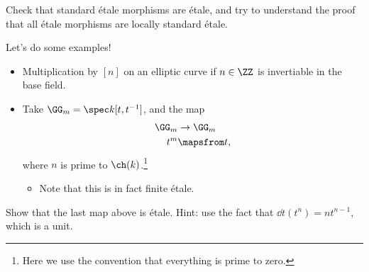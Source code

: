 \begin{exercise}[?]

Check that standard étale morphisms are étale, and try to understand the
proof that all étale morphisms are locally standard étale.

\end{exercise}

Let's do some examples!

\begin{example}

\envlist

\begin{itemize}
\item
  Multiplication by \([n]\) on an elliptic curve if \(n \in \ZZ\) is
  invertiable in the base field.
\item
  Take \(\GG_m = \spec k[t, t^{-1}]\), and the map
  \begin{align*}  
  \GG_m &\to \GG_m \\
   t^m &\mapsfrom t
  ,\end{align*} where \(n\) is prime to \(\ch(k)\).\footnote{Here we use
    the convention that everything is prime to zero.}

  \begin{itemize}
  \tightlist
  \item
    Note that this is in fact finite étale.
  \end{itemize}
\end{itemize}

\end{example}

\begin{exercise}[?]

Show that the last map above is étale. Hint: use the fact that
\(\dd{}{t} (t^n) = nt^{n-1}\), which is a unit.

\end{exercise}

